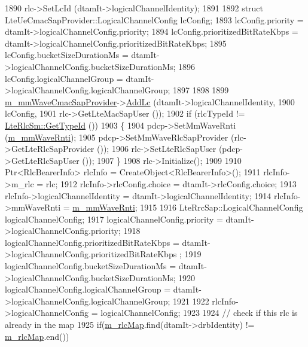 \begin{DoxyCode}
1890           rlc->SetLcId (dtamIt->logicalChannelIdentity);
1891 
1892           \textcolor{keyword}{struct }LteUeCmacSapProvider::LogicalChannelConfig lcConfig;
1893           lcConfig.priority = dtamIt->logicalChannelConfig.priority;
1894           lcConfig.prioritizedBitRateKbps = dtamIt->logicalChannelConfig.prioritizedBitRateKbps;
1895           lcConfig.bucketSizeDurationMs = dtamIt->logicalChannelConfig.bucketSizeDurationMs;
1896           lcConfig.logicalChannelGroup = dtamIt->logicalChannelConfig.logicalChannelGroup;      
1897 
1898 
1899           \hyperlink{classns3_1_1LteUeRrc_ac48418b0f235043204868e73c073ec0b}{m\_mmWaveCmacSapProvider}->\hyperlink{classns3_1_1LteUeCmacSapProvider_a62f2d731c336ca14e98e95a3215e92ec}{AddLc} (dtamIt->logicalChannelIdentity, 
1900                                   lcConfig,
1901                                   rlc->GetLteMacSapUser ());
1902           \textcolor{keywordflow}{if} (rlcTypeId != \hyperlink{classns3_1_1LteRlcSm_a160bd39ce4e0d113dd5d93cc3a258045}{LteRlcSm::GetTypeId} ())
1903           \{
1904             pdcp->SetMmWaveRnti (\hyperlink{classns3_1_1LteUeRrc_a0bd0d5c3b49624be1fd217f96910f56a}{m\_mmWaveRnti});
1905             pdcp->SetMmWaveRlcSapProvider (rlc->GetLteRlcSapProvider ());
1906             rlc->SetLteRlcSapUser (pdcp->GetLteRlcSapUser ());
1907           \} 
1908           rlc->Initialize();
1909 
1910           Ptr<RlcBearerInfo> rlcInfo = CreateObject<RlcBearerInfo>();
1911           rlcInfo->m\_rlc = rlc;
1912           rlcInfo->rlcConfig.choice = dtamIt->rlcConfig.choice;
1913           rlcInfo->logicalChannelIdentity = dtamIt->logicalChannelIdentity;
1914           rlcInfo->mmWaveRnti = \hyperlink{classns3_1_1LteUeRrc_a0bd0d5c3b49624be1fd217f96910f56a}{m\_mmWaveRnti};
1915 
1916           LteRrcSap::LogicalChannelConfig logicalChannelConfig;
1917           logicalChannelConfig.priority = dtamIt->logicalChannelConfig.priority;
1918           logicalChannelConfig.prioritizedBitRateKbps = dtamIt->logicalChannelConfig.prioritizedBitRateKbps
      ;
1919           logicalChannelConfig.bucketSizeDurationMs = dtamIt->logicalChannelConfig.bucketSizeDurationMs;
1920           logicalChannelConfig.logicalChannelGroup = dtamIt->logicalChannelConfig.logicalChannelGroup;  
1921 
1922           rlcInfo->logicalChannelConfig = logicalChannelConfig;
1923 
1924           \textcolor{comment}{// check if this rlc is already in the map}
1925           \textcolor{keywordflow}{if}(\hyperlink{classns3_1_1LteUeRrc_a64b3948cda818827b8774d7a2be7ea4f}{m\_rlcMap}.find(dtamIt->drbIdentity) != \hyperlink{classns3_1_1LteUeRrc_a64b3948cda818827b8774d7a2be7ea4f}{m\_rlcMap}.end())

\end{DoxyCode}
